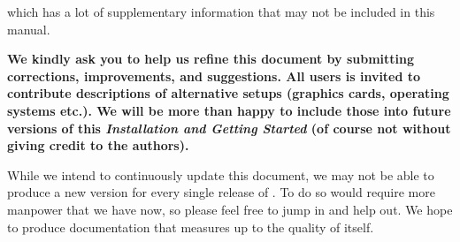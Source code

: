 
which has a lot of supplementary information that may not be included in this manual.

\textbf{We kindly ask you to help us refine this document by submitting corrections,
improvements, and suggestions. All users is invited to contribute descriptions of alternative
setups (graphics cards, operating systems etc.). We will be more than happy to include
those into future versions of this \textit{Installation and Getting Started} (of course
not without giving credit to the authors).}

While we intend to continuously update this document, we may not be able to produce a
new version for every single release of {\FlightGear{}}.  To do so would require more
manpower that we have now, so please feel free to jump in and help out.  We hope to
produce documentation that measures up to the quality of \FlightGear{} itself.


